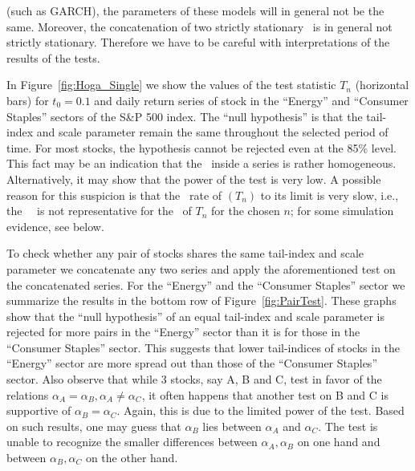 (such as GARCH), the parameters of these models will in general not be the same. Moreover, the concatenation
of two strictly stationary \ts\ is in general not strictly stationary. Therefore we have to be careful
with interpretations of the results of the tests.
\par 
In Figure~\ref{fig:Hoga_Single} we show the values of the test statistic $T_n$ (horizontal bars)
for $t_0=0.1$ and daily return series of stock in the ``Energy'' and ``Consumer Staples'' sectors of the S\&P
500 index. The ``null hypothesis'' is that the tail-index and scale parameter remain the
same throughout the selected period of time. For most stocks, the hypothesis cannot be rejected even at the 85\% level.
This fact may be an indication that the \ds\ inside a series is rather homogeneous.
Alternatively, it may show that the power of the test is very low. A possible reason for this suspicion is that the \con\ rate
of $(T_n)$ to its limit is very slow, i.e., the \asy\ \ds\ is not representative for the \ds\ of $T_n$ for the chosen $n$; for some
simulation evidence, see below.
\par
To check whether any pair of stocks shares the same tail-index and scale parameter we concatenate
any two series and apply the aforementioned test on the concatenated series. For the ``Energy'' and the
``Consumer Staples'' sector we summarize the results in the bottom row of Figure~\ref{fig:PairTest}.
These graphs show that the ``null
hypothesis'' of an equal tail-index and scale parameter is rejected for more pairs in the
``Energy'' sector than it is for those in the ``Consumer Staples''
sector. This suggests that lower tail-indices of stocks in the
``Energy'' sector are more spread out than those of the ``Consumer
Staples'' sector. Also observe that while 3 stocks, say A, B and C, test in favor of
the relations $\alpha_A = \alpha_B, \alpha_A \neq \alpha_C$, it often
happens that another test on B and C is supportive of $\alpha_B = \alpha_C$. Again,
this is due to the limited power of the test. Based
on such results, one may guess that $\alpha_B$ lies between $\alpha_A$ and
$\alpha_C$. The test is unable to recognize the smaller differences
between $\alpha_A, \alpha_B$ on one hand and between $\alpha_B, \alpha_C$ on the other hand.
